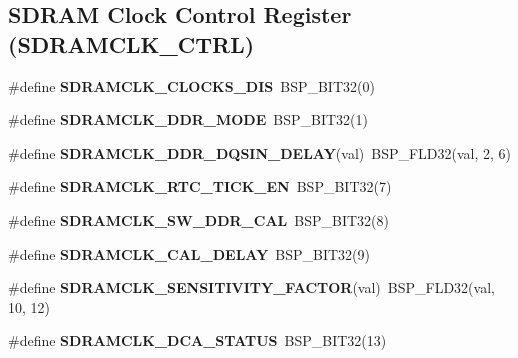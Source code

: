 \subsection*{S\+D\+R\+AM Clock Control Register (S\+D\+R\+A\+M\+C\+L\+K\+\_\+\+C\+T\+RL)}
\begin{DoxyCompactItemize}
\item 
\mbox{\label{group__lpc__emc_gaa00ac300589828faa76d127492fe4f80}} 
\#define {\bfseries S\+D\+R\+A\+M\+C\+L\+K\+\_\+\+C\+L\+O\+C\+K\+S\+\_\+\+D\+IS}~B\+S\+P\+\_\+\+B\+I\+T32(0)
\item 
\mbox{\label{group__lpc__emc_ga79d3094c0cf72b70ad779e7cf18e2542}} 
\#define {\bfseries S\+D\+R\+A\+M\+C\+L\+K\+\_\+\+D\+D\+R\+\_\+\+M\+O\+DE}~B\+S\+P\+\_\+\+B\+I\+T32(1)
\item 
\mbox{\label{group__lpc__emc_gaa47adab891405b30c09a8d94f941e8d6}} 
\#define {\bfseries S\+D\+R\+A\+M\+C\+L\+K\+\_\+\+D\+D\+R\+\_\+\+D\+Q\+S\+I\+N\+\_\+\+D\+E\+L\+AY}(val)~B\+S\+P\+\_\+\+F\+L\+D32(val, 2, 6)
\item 
\mbox{\label{group__lpc__emc_ga81da156f8d7c187eb32d67d68dd5947f}} 
\#define {\bfseries S\+D\+R\+A\+M\+C\+L\+K\+\_\+\+R\+T\+C\+\_\+\+T\+I\+C\+K\+\_\+\+EN}~B\+S\+P\+\_\+\+B\+I\+T32(7)
\item 
\mbox{\label{group__lpc__emc_gad7392c9a8e89a7587e305040b55f64ae}} 
\#define {\bfseries S\+D\+R\+A\+M\+C\+L\+K\+\_\+\+S\+W\+\_\+\+D\+D\+R\+\_\+\+C\+AL}~B\+S\+P\+\_\+\+B\+I\+T32(8)
\item 
\mbox{\label{group__lpc__emc_ga636f412b8a5fddb77e2b158ac37175c7}} 
\#define {\bfseries S\+D\+R\+A\+M\+C\+L\+K\+\_\+\+C\+A\+L\+\_\+\+D\+E\+L\+AY}~B\+S\+P\+\_\+\+B\+I\+T32(9)
\item 
\mbox{\label{group__lpc__emc_ga2ca0f3d2c4ef7bb61c734b47e117c1be}} 
\#define {\bfseries S\+D\+R\+A\+M\+C\+L\+K\+\_\+\+S\+E\+N\+S\+I\+T\+I\+V\+I\+T\+Y\+\_\+\+F\+A\+C\+T\+OR}(val)~B\+S\+P\+\_\+\+F\+L\+D32(val, 10, 12)
\item 
\mbox{\label{group__lpc__emc_ga9e5d6daf912d1916c40c18939c18297a}} 
\#define {\bfseries S\+D\+R\+A\+M\+C\+L\+K\+\_\+\+D\+C\+A\+\_\+\+S\+T\+A\+T\+US}~B\+S\+P\+\_\+\+B\+I\+T32(13)

\end{DoxyCompactItemize}
